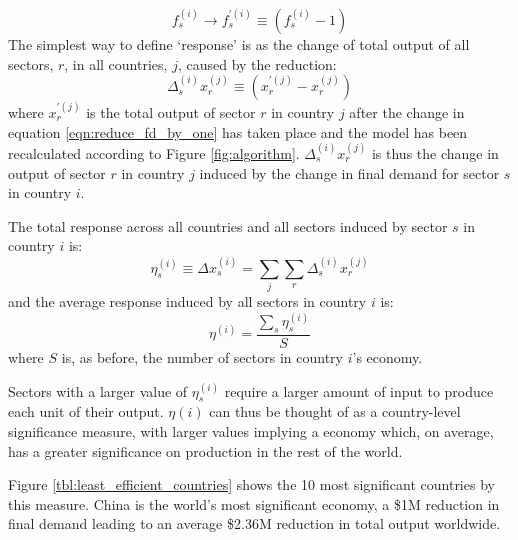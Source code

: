 \documentclass[a4paper]{article}
\begin{document}
\begin{equation}\label{eqn:reduce_fd_by_one}
f_s^{(i)} \rightarrow f_s^{\prime (i)} \equiv (f_s^{(i)} - 1)
\end{equation}
The simplest way to define `response' is as the change of total output of all sectors, $r$, in all countries, $j$, caused by the reduction:
\begin{equation}
\Delta_{s}^{(i)} x_{r}^{(j)} \equiv (x_{r}^{\prime(j)} - x_r^{(j)})
\end{equation}
where $x_{r}^{\prime(j)}$ is the total output of sector $r$ in country $j$ after the change in equation \eqref{eqn:reduce_fd_by_one} has taken place and the model has been recalculated according to Figure \ref{fig:algorithm}.
$\Delta_{s}^{(i)} x_{r}^{(j)}$ is thus the change in output of sector $r$ in country $j$ induced by the change in final demand for sector $s$ in country $i$.

The total response across all countries and all sectors induced by sector $s$ in country $i$ is:
\begin{equation}
\eta_s^{(i)} \equiv \Delta x_{s}^{(i)} = \sum_j \sum_r \Delta_{s}^{(i)} x_{r}^{(j)}
\end{equation}
and the average response induced by all sectors in country $i$ is:
\begin{equation}
\eta^{(i)} = \frac{\sum_s \eta_s^{(i)}}{S}
\end{equation}
where $S$ is, as before, the number of sectors in country $i$'s economy.

Sectors with a larger value of $\eta_s^{(i)}$ require a larger amount of input to produce each unit of their output. $\eta{(i)}$ can thus be thought of as a country-level significance measure, with larger values implying a economy which, on average, has a greater significance on production in the rest of the world.

Figure \ref{tbl:least_efficient_countries} shows the 10 most significant countries by this measure.
China is the world's most significant economy, a \$1M reduction in final demand leading to an average \$2.36M reduction in total output worldwide.
\end{document}
